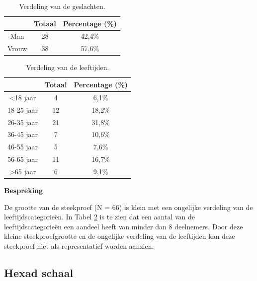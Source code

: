 \begin{table}
\begin{center}
    \begin{tabular}{c|c|c}
        & \textbf{Totaal} & \textbf{Percentage} (\%) \\
        \hline
        Man & 28 & 42,4\% \\
        \hline
        Vrouw & 38 & 57,6\% \\
    \end{tabular}
\end{center}
\caption{Verdeling van de geslachten.}
\label{tab:verdelinggeslacht}
\end{table}

\begin{table}
    \begin{center}
        \begin{tabular}{c|c|c}
            & \textbf{Totaal} & \textbf{Percentage} (\%) \\
            \hline
            <18 jaar & 4 & 6,1\% \\
            \hline
            18-25 jaar & 12 & 18,2\% \\
            \hline
            26-35 jaar & 21 & 31,8\% \\
            \hline
            36-45 jaar & 7 & 10,6\% \\
            \hline
            46-55 jaar & 5 & 7,6\% \\
            \hline
            56-65 jaar & 11 & 16,7\% \\
            \hline
            >65 jaar & 6 & 9,1\% \\
        \end{tabular}
    \end{center}
\caption{Verdeling van de leeftijden.}
\label{tab:verdelingleeftijden}
\end{table}

\textbf{Bespreking}

De grootte van de steekproef (N = 66) is klein met een ongelijke verdeling van de leeftijdscategorieën. In Tabel \ref{tab:verdelingleeftijden} is te zien dat een aantal van de leeftijdscategorieën een aandeel heeft van minder dan 8 deelnemers. Door deze kleine steekproefgrootte en de ongelijke verdeling van de leeftijden kan deze steekproef niet als representatief worden aanzien.

\subsection{Hexad schaal}

